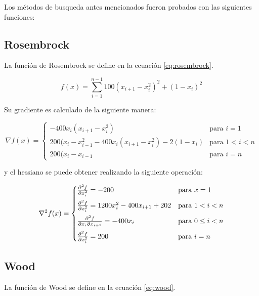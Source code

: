 Los métodos de busqueda antes mencionados fueron probados con las siguientes funciones:

\subsection*{Rosembrock}

La función de Rosembrock se define en la ecuación \ref{eq:rosembrock}.

\begin{equation}
    f(x) = \sum_{i=1}^{n-1}  100(x_{i+1}-x_{i}^2)^2 +(1-x_i)^2
    \label{eq:rosembrock}
\end{equation}

Su gradiente es calculado de la siguiente manera:

\begin{equation}
    \nabla f (x) =\begin{cases}
        -400x_i(x_{i+1}-x_{i}^2)                              & \text{para } i=1   \\[0.25cm]
        200(x_{i}-x_{i-1}^2-400x_i(x_{i+1}-x_{i}^2) -2(1-x_i) & \text{para } 1<i<n \\[0.25cm]
        200(x_{i}-x_{i-1}                                     & \text{para } i=n
    \end{cases} \label{eq:rosembrock_gradient}
\end{equation}


y el hessiano se puede obtener realizando la siguiente operación:

\begin{equation}
    \nabla^2 f(x)  = \begin{cases}
        \frac{\partial^2 f}{\partial x_i^2} = -200                    & \text{para } x=1         \\[0.25cm]
        \frac{\partial^2 f}{\partial x_i^2} =1200x_i^2-400x_{i+1}+202 & \text{para } 1<i<n       \\[0.25cm]
        \frac{\partial^2 f}{\partial x_i \partial x_{i+1}}  = -400x_i       & \text{para } 0\leq i < n \\[0.25cm]
        \frac{\partial^2 f}{\partial x_i^2} = 200                     & \text{para } i=n
    \end{cases}
    \label{eq:rosembrock_hessian}
\end{equation}

\subsection*{Wood}

La función de Wood se define en la ecuación \ref{eq:wood}.

